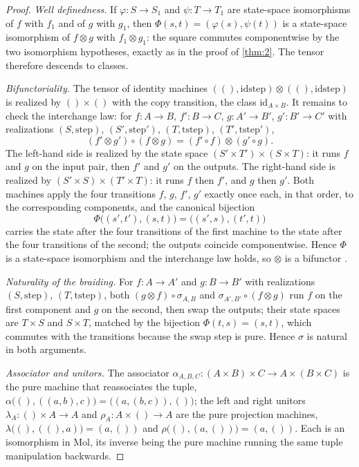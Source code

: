 \begin{proof}
\emph{Well definedness.} If $\varphi : S \to S_1$ and $\psi : T \to T_1$ are
state-space isomorphisms of $f$ with $f_1$ and of $g$ with $g_1$, then
$\Phi (s, t) = (\varphi (s), \psi (t))$ is a state-space isomorphism of
$f \otimes g$ with $f_1 \otimes g_1$: the square commutes componentwise by the
two isomorphism hypotheses, exactly as in the proof of \autoref{thm:2}. The
tensor therefore descends to classes.

\emph{Bifunctoriality.} The tensor of identity machines
$((), \mathrm{idstep}) \otimes ((), \mathrm{idstep})$ is realized by
$() \times ()$ with the copy transition, the class
$\mathrm{id}_{A \times B}$. It remains to check the interchange law: for
$f : A \to B$, $f' : B \to C$, $g : A' \to B'$, $g' : B' \to C'$ with
realizations $(S, \mathrm{step})$, $(S', \mathrm{step}')$, $(T, \mathrm{tstep})$,
$(T', \mathrm{tstep}')$,
\[ (f' \otimes g') \circ (f \otimes g)
   = (f' \circ f) \otimes (g' \circ g) . \]
The left-hand side is realized by the state space
$(S' \times T') \times (S \times T)$: it runs $f$ and $g$ on the input pair,
then $f'$ and $g'$ on the outputs. The right-hand side is realized by
$(S' \times S) \times (T' \times T)$: it runs $f$ then $f'$, and $g$ then
$g'$. Both machines apply the four transitions $f$, $g$, $f'$, $g'$ exactly
once each, in that order, to the corresponding components, and the canonical
bijection
\[ \Phi\bigl ((s', t'), (s, t)\bigr) = \bigl ((s', s), (t', t)\bigr) \]
carries the state after the four transitions of the first machine to the
state after the four transitions of the second; the outputs coincide
componentwise. Hence $\Phi$ is a state-space isomorphism and the interchange
law holds, so $\otimes$ is a bifunctor \citep{maclane}.

\emph{Naturality of the braiding.} For $f : A \to A'$ and $g : B \to B'$
with realizations $(S, \mathrm{step})$, $(T, \mathrm{tstep})$, both
$(g \otimes f) \circ \sigma_{A,B}$ and
$\sigma_{A',B'} \circ (f \otimes g)$ run $f$ on the first component and $g$
on the second, then swap the outputs; their state spaces are
$T \times S$ and $S \times T$, matched by the bijection
$\Phi (t, s) = (s, t)$, which commutes with the transitions because the swap
step is pure. Hence $\sigma$ is natural in both arguments.

\emph{Associator and unitors.} The associator
$\alpha_{A,B,C} : (A \times B) \times C \to A \times (B \times C)$ is the pure
machine that reassociates the tuple,
$\alpha\bigl ((), ((a, b), c)\bigr) = \bigl ((a, (b, c)), ()\bigr)$; the left and right unitors
$\lambda_A : () \times A \to A$ and $\rho_A : A \times () \to A$ are the pure
projection machines, $\lambda\bigl ((), ((), a)\bigr) = (a, ())$ and
$\rho\bigl ((), (a, ())\bigr) = (a, ())$. Each is an isomorphism in Mol, its inverse
being the pure machine running the same tuple manipulation backwards.


\end{proof}
